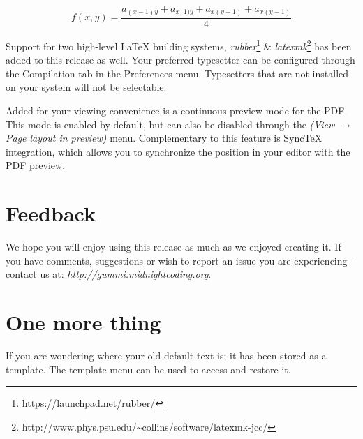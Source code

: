 \documentclass[11pt]{article}
\begin{document}
\[  f(x, y) = \frac{a_{(x-1)y} + a_{x_+1)y} + a_{x(y+1)} + a_{x(y-1)}}{4}  \]





	
	
	


 
Support for two high-level {\LaTeX} building systems, \emph{rubber}\footnote{https://launchpad.net/rubber/} \& \emph{latexmk}\footnote{http://www.phys.psu.edu/{\textasciitilde}collins/software/latexmk-jcc/} has been added to this release as well. Your preferred typesetter can be configured through the Compilation tab in the Preferences menu. Typesetters that are not installed on your system will not be selectable. 

Added for your viewing convenience is a continuous preview mode for the PDF. This mode is enabled by default, but can also be disabled through the \emph{(View $\rightarrow$ Page layout in preview)} menu. Complementary to this feature is SyncTeX integration, which allows you to synchronize the position in your editor with the PDF preview. 

\section{Feedback}
We hope you will enjoy using this release as much as we enjoyed creating it. If you have comments, suggestions or wish to report an issue you are experiencing - contact us at: \emph{http://gummi.midnightcoding.org}.

\section{One more thing}
If you are wondering where your old default text is; it has been stored as a template. The template menu can be used to access and restore it. 
\end{document}
